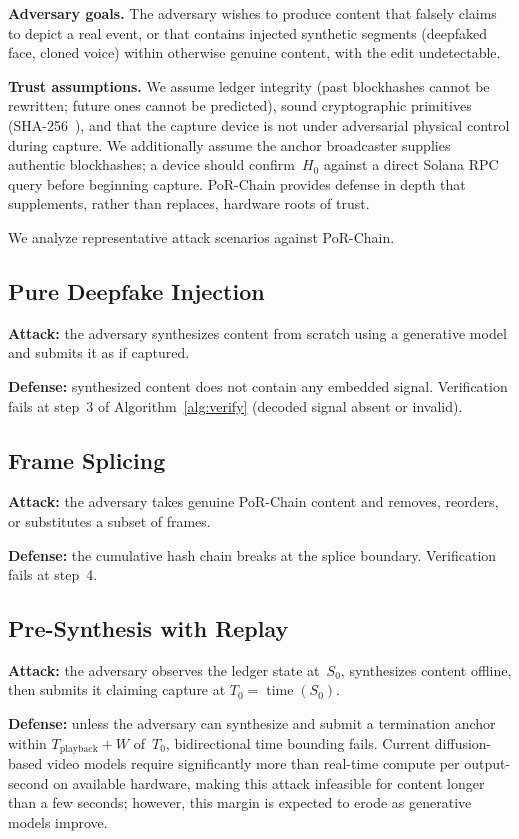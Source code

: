 \documentclass[11pt]{article}
\begin{document}
\textbf{Adversary goals.} The adversary wishes to produce content that falsely
claims to depict a real event, or that contains injected synthetic segments
(deepfaked face, cloned voice) within otherwise genuine content, with the edit
undetectable.

\textbf{Trust assumptions.} We assume ledger integrity (past blockhashes cannot be
rewritten; future ones cannot be predicted), sound cryptographic primitives
(SHA-256~\cite{nist-sha}), and that the capture device is not under adversarial
physical control during capture. We additionally assume the anchor broadcaster
supplies authentic blockhashes; a device should confirm~$H_0$ against a direct
Solana RPC query before beginning capture. PoR-Chain provides defense in depth
that supplements, rather than replaces, hardware roots of trust.

We analyze representative attack scenarios against PoR-Chain.

\subsection{Pure Deepfake Injection}

\textbf{Attack:} the adversary synthesizes content from scratch using a generative
model and submits it as if captured.

\textbf{Defense:} synthesized content does not contain any embedded signal.
Verification fails at step~3 of Algorithm~\ref{alg:verify} (decoded signal absent or
invalid).

\subsection{Frame Splicing}

\textbf{Attack:} the adversary takes genuine PoR-Chain content and removes,
reorders, or substitutes a subset of frames.

\textbf{Defense:} the cumulative hash chain breaks at the splice boundary.
Verification fails at step~4.

\subsection{Pre-Synthesis with Replay}

\textbf{Attack:} the adversary observes the ledger state at~$S_0$, synthesizes
content offline, then submits it claiming capture at $T_0 = \operatorname{time}(S_0)$.

\textbf{Defense:} unless the adversary can synthesize and submit a termination
anchor within $T_{\text{playback}} + W$ of~$T_0$, bidirectional time
bounding fails. Current diffusion-based video models require significantly more than real-time
compute per output-second on available hardware, making this attack infeasible
for content longer than a few seconds; however, this margin is expected to erode
as generative models improve.
\end{document}
